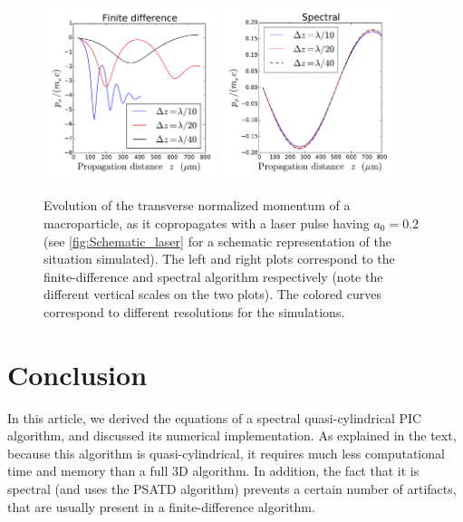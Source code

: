 \documentclass[1p,times]{elsarticle}
\begin{document}
\begin{figure}[!h]
\centering
\includegraphics[width=0.45\textwidth]{figures/Laser_finite-difference.pdf}
\includegraphics[width=0.45\textwidth]{figures/Laser_spectral.pdf}
\caption{\label{fig:Laser}Evolution of the transverse normalized
  momentum of a macroparticle, as it copropagates with a
  laser pulse having $a_0 = 0.2$ (see \cref{fig:Schematic_laser} for a
  schematic representation of the situation simulated). The left and
  right plots correspond to the finite-difference and spectral
  algorithm respectively (note the different vertical scales on the two
  plots). The colored curves correspond to different resolutions for the simulations.}
\end{figure}


\section*{Conclusion}

In this article, we derived the equations of a spectral
quasi-cylindrical PIC algorithm, and discussed its numerical
implementation. As explained in the text, because this algorithm is
quasi-cylindrical, it requires much less computational
time and memory than a full 3D algorithm. In addition, the fact
that it is spectral (and uses the PSATD algorithm) prevents a certain number of
artifacts, that are usually present in a finite-difference algorithm.
\end{document}
